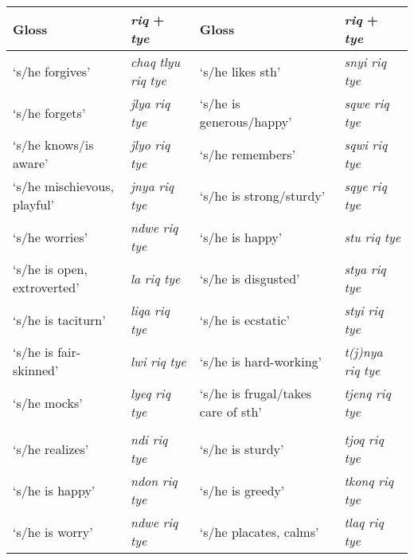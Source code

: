 \documentclass[output=paper]{langsci/langscibook}
\begin{document}
\begin{table}
\footnotesize
\begin{tabularx}{\textwidth}{QlQl}
\lsptoprule
Gloss&\emph{riq} + \emph{tye}&Gloss&\emph{riq} + \emph{tye} \\
\midrule
`s/he forgives'&\emph{chaq} \emph{tlyu} \emph{riq} \emph{tye}&`s/he likes sth'&\emph{snyi} \emph{riq} \emph{tye} \\
`s/he forgets'&\emph{jlya} \emph{riq} \emph{tye}&`s/he is generous/happy'&\emph{sqwe} \emph{riq} \emph{tye}  \\
`s/he knows/is aware'&\emph{jlyo} \emph{riq} \emph{tye}&`s/he remembers'&\emph{sqwi} \emph{riq} \emph{tye} \\
`s/he mischievous, playful'&\emph{jnya} \emph{riq} \emph{tye}&`s/he is strong/sturdy'&\emph{sqye} \emph{riq} \emph{tye} \\
`s/he worries'&\emph{ndwe} \emph{riq} \emph{tye}&`s/he is happy'&\emph{stu} \emph{riq} \emph{tye}  \\
`s/he is open, extroverted'&\emph{la} \emph{riq} \emph{tye}&`s/he is disgusted'&\emph{stya} \emph{riq} \emph{tye} \\
`s/he is taciturn'&\emph{liqa} \emph{riq} \emph{tye}&`s/he is ecstatic'&\emph{styi} \emph{riq} \emph{tye} \\
`s/he is fair-skinned'&\emph{lwi} \emph{riq} \emph{tye}&`s/he is hard-working'&\emph{t(j)nya} \emph{riq} \emph{tye} \\
`s/he mocks'&\emph{lyeq} \emph{riq} \emph{tye} &`s/he is frugal/takes care of sth' & \emph{tjenq} \emph{riq} \emph{tye} \\
&&&\\
`s/he realizes'&\emph{ndi} \emph{riq} \emph{tye}&`s/he is sturdy'&\emph{tjoq} \emph{riq} \emph{tye} \\
`s/he is happy'&\emph{ndon} \emph{riq} \emph{tye}&`s/he is greedy'&\emph{tkonq} \emph{riq} \emph{tye}  \\
`s/he is worry'&\emph{ndwe} \emph{riq} \emph{tye}&`s/he placates, calms'&\emph{tlaq} \emph{riq} \emph{tye} \\

\end{tabularx}
\end{table}
\end{document}

